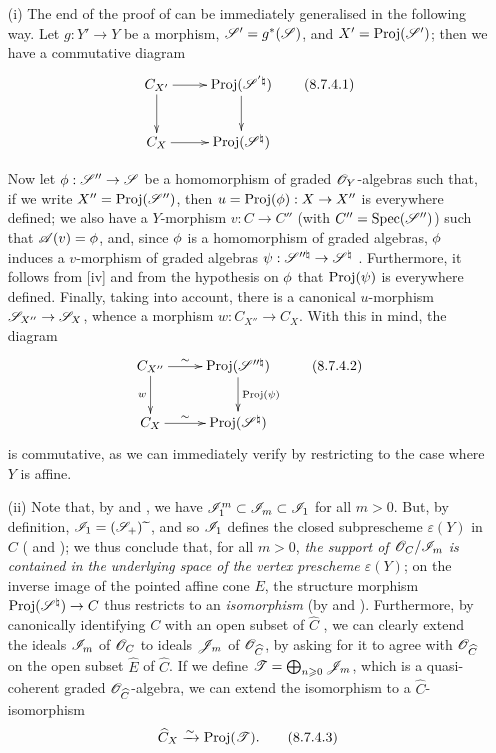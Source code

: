 \begin{remark}[8.7.4]
\label{II.8.7.4}
\begin{enumerate}
  \item[\rm{(i)}] The end of the proof of  can be immediately generalised in the following way.
    Let $g:Y'\to Y$ be a morphism, $\mathscr{S}'=g^*(\mathscr{S})$, and $X'=\operatorname{Proj}(\mathscr{S}')$;
    then we have a commutative diagram
    \[
    \label{II.8.7.4.1}
      \xymatrix{
        C_{X'}
          \ar[r]
          \ar[d]
      & \Proj(\sh{S}^{'\natural})
          \ar[d]
      \\C_X
          \ar[r]
      & \Proj(\sh{S}^\natural)
      }
    \tag{8.7.4.1}
    \]

    Now let $\vphi:\sh{S}''\to\sh{S}$ be a homomorphism of graded $\mathscr{O}_Y$-algebras such that, if we write $X''=\operatorname{Proj}(\mathscr{S}'')$, then $u=\Proj(\vphi):X\to X''$ is everywhere defined;
    we also have
    a $Y$-morphism $v:C\to C''$ (with $C''=\operatorname{Spec}(\mathscr{S}'')$) such that $\mathscr{A}(v)=\phi$, and, since $\phi$ is a homomorphism of graded algebras, $\phi$ induces a $v$-morphism of graded algebras $\psi:\sh{S}^{\prime\prime\natural}\to\sh{S}^\natural$ .
    Furthermore, it follows from [iv] and from the hypothesis on $\phi$ that $\operatorname{Proj}(\psi)$ is everywhere defined.
    Finally, taking  into account, there is a canonical $u$-morphism $\sh{S}_{X''}\to\sh{S}_X$, whence  a morphism $w:C_{X''}\to C_X$.
    With this in mind, the diagram
    \[
    \label{II.8.7.4.2}
      \xymatrix{
        C_{X''}
          \ar[r]^-{\sim}
          \ar[d]_{w}
      & \Proj(\sh{S}^{\prime\prime\natural})
          \ar[d]^{\Proj(\psi)}
      \\C_X
          \ar[r]^-{\sim}
      & \Proj(\sh{S}^\natural)
      }
    \tag{8.7.4.2}
    \]
    is commutative, as we can immediately verify by restricting to the case where $Y$ is affine.
  \item[\rm{(ii)}] Note that, by  and , we have $\mathscr{I}_1^m\subset\mathscr{I}_m\subset\mathscr{I}_1$ for all $m>0$.
    But, by definition, $\mathscr{I}_1=(\mathscr{S}_+){\,\widetilde{\,}\,}$, and so $\mathscr{I}_1$ defines the closed subprescheme $\varepsilon(Y)$ in $C$ ( and );
    we thus conclude that, for all $m>0$, \emph{the support of $\mathscr{O}_C/\mathscr{I}_m$ is contained in the underlying space of the vertex prescheme $\varepsilon(Y)$};
    on the inverse image of the pointed affine cone $E$, the structure morphism $\Proj(\sh{S}^\natural)\to C$ thus restricts to an \emph{isomorphism} (by  and ).
    Furthermore, by canonically identifying $C$ with an open subset of $\widehat{C}$ , we can clearly extend the ideals $\mathscr{I}_m$ of $\mathscr{O}_C$ to ideals $\mathscr{J}_m$ of $\mathscr{O}_{\widehat{C}}$, by asking for it to agree with $\mathscr{O}_{\widehat{C}}$ on the open subset $\widehat{E}$ of $\widehat{C}$.
    If we define $\mathscr{T}=\bigoplus_{n\geqslant 0}\mathscr{J}_m$, which is a quasi-coherent graded $\mathscr{O}_{\widehat{C}}$-algebra, we can extend the isomorphism  to a $\widehat{C}$-isomorphism
    \[
    \label{II.8.7.4.3}
      \widehat{C}_X \xrightarrow{\sim} \operatorname{Proj}(\mathscr{T}).
    \tag{8.7.4.3}
    \]


\end{enumerate}
\end{remark}
